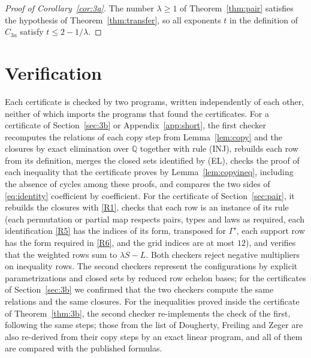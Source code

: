 \documentclass[11pt]{amsart}
\theoremstyle{definition}
\theoremstyle{remark}
\numberwithin{equation}{section}
\newcommand{\Q}{\mathbb{Q}}
\newcommand{\LmDepth}{12}
\begin{document}
\begin{proof}[Proof of Corollary~\ref{cor:3a}]
The number $\lambda\ge1$ of Theorem~\ref{thm:pair} satisfies the hypothesis of Theorem~\ref{thm:transfer}, so all exponents $t$ in the definition of $C_{3a}$ satisfy $t\le2-1/\lambda$.
\end{proof}

\section{Verification}\label{sec:verify}

Each certificate is checked by two programs, written independently of each other, neither of which imports the programs that found the certificates. For a certificate of Section~\ref{sec:3b} or Appendix~\ref{app:short}, the first checker recomputes the relations of each copy step from Lemma~\ref{lem:copy} and the closures by exact elimination over $\Q$ together with rule (INJ), rebuilds each row from its definition, merges the closed sets identified by (EL), checks the proof of each inequality that the certificate proves by Lemma~\ref{lem:copyineq}, including the absence of cycles among these proofs, and compares the two sides of \eqref{eq:identity} coefficient by coefficient. For the certificate of Section~\ref{sec:pair}, it rebuilds the closures with \ref{R1}, checks that each row is an instance of its rule (each permutation or partial map respects pairs, types and laws as required, each identification \ref{R5} has the indices of its form, transposed for $\Gamma'$, each support row has the form required in \ref{R6}, and the grid indices are at most $\LmDepth$), and verifies that the weighted rows sum to $\lambda S-L$. Both checkers reject negative multipliers on inequality rows. The second checkers represent the configurations by explicit parametrizations and closed sets by reduced row echelon bases; for the certificates of Section~\ref{sec:3b} we confirmed that the two checkers compute the same relations and the same closures. For the inequalities proved inside the certificate of Theorem~\ref{thm:3b}, the second checker re-implements the check of the first, following the same steps; those from the list of Dougherty, Freiling and Zeger are also re-derived from their copy steps by an exact linear program, and all of them are compared with the published formulas.
\end{document}
